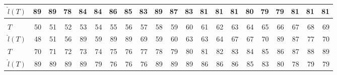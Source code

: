 \documentclass[12pt,a4paper]{article}
\begin{document}
\begin{landscape}
\begin{table}[htbp]
\begin{tabular*}{\linewidth}{@{\extracolsep{\fill}}lrrrrrrrrrrrrrrrrrrrr}
			$\hat{l}(T)$ & 89 & 89 & 78 & 84 & 84 & 86 & 85 & 83 & 89 & 87 & 83 & 81 & 81 & 81 & 80 & 79 & 79 & 81 & 81 & 81 \\
			\midrule\addlinespace[2.5pt]
			\multicolumn{21}{c}{\textbf{$\tau=0.95,\ T_{\mathrm{stab}}=85,\ \varepsilon=5$}} \\
			\addlinespace[2.5pt]
			\midrule
			$T$ & 50 & 51 & 52 & 53 & 54 & 55 & 56 & 57 & 58 & 59 & 60 & 61 & 62 & 63 & 64 & 65 & 66 & 67 & 68 & 69 \\
			$\hat{l}(T)$ & 48 & 51 & 56 & 89 & 59 & 89 & 89 & 69 & 59 & 60 & 63 & 63 & 64 & 67 & 67 & 70 & 89 & 87 & 77 & 70 \\
			$T$ & 70 & 71 & 72 & 73 & 74 & 75 & 76 & 77 & 78 & 79 & 80 & 81 & 82 & 83 & 84 & 85 & 86 & 87 & 88 & 89 \\
			$\hat{l}(T)$ & 89 & 89 & 89 & 89 & 79 & 76 & 76 & 76 & 89 & 89 & 89 & 86 & 86 & 86 & 85 & 83 & 80 & 78 & 79 & 79 \\
			\bottomrule
		\end{tabular*}
	\end{table}
\end{landscape}
\end{document}
